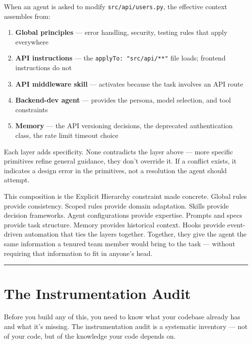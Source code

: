 \documentclass[
  a4paper,
  DIV=11,
  numbers=noendperiod]{scrreprt}
\providecommand{\tightlist}{%
  \setlength{\itemsep}{0pt}\setlength{\parskip}{0pt}}
\begin{document}
When an agent is asked to modify \texttt{src/api/users.py}, the
effective context assembles from:

\begin{enumerate}
\def\labelenumi{\arabic{enumi}.}
\tightlist
\item
  \textbf{Global principles} --- error handling, security, testing rules
  that apply everywhere
\item
  \textbf{API instructions} --- the \texttt{applyTo:\ "src/api/**"} file
  loads; frontend instructions do not
\item
  \textbf{API middleware skill} --- activates because the task involves
  an API route
\item
  \textbf{Backend-dev agent} --- provides the persona, model selection,
  and tool constraints
\item
  \textbf{Memory} --- the API versioning decisions, the deprecated
  authentication class, the rate limit timeout choice
\end{enumerate}

Each layer adds specificity. None contradicts the layer above --- more
specific primitives refine general guidance, they don't override it. If
a conflict exists, it indicates a design error in the primitives, not a
resolution the agent should attempt.

This composition is the Explicit Hierarchy constraint made concrete.
Global rules provide consistency. Scoped rules provide domain
adaptation. Skills provide decision frameworks. Agent configurations
provide expertise. Prompts and specs provide task structure. Memory
provides historical context. Hooks provide event-driven automation that
ties the layers together. Together, they give the agent the same
information a tenured team member would bring to the task --- without
requiring that information to fit in anyone's head.

\begin{center}\rule{0.5\linewidth}{0.5pt}\end{center}

\section{The Instrumentation Audit}\label{the-instrumentation-audit}

Before you build any of this, you need to know what your codebase
already has and what it's missing. The instrumentation audit is a
systematic inventory --- not of your code, but of the knowledge your
code depends on.
\end{document}
